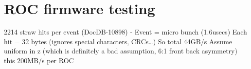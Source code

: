 \section{ROC firmware testing}


2214 straw hits per event (DocDB-10898)
- Event = micro bunch (1.6usecs)
 Each hit = 32 bytes (ignores special characters, CRCs…)
 So total 44GB/s
 Assume uniform in z (which is definitely a bad assumption, 6:1
front back asymmetry) this 200MB/s per ROC
\fi




